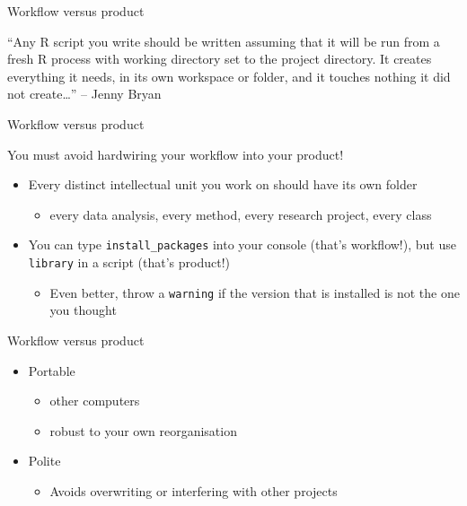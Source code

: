 \documentclass[ignorenonframetext,]{beamer}
\providecommand{\tightlist}{%
  \setlength{\itemsep}{0pt}\setlength{\parskip}{0pt}}
\begin{document}
\begin{frame}{Workflow versus product}
\protect\hypertarget{workflow-versus-product-2}{}

``Any R script you write should be written assuming that it will be run
from a fresh R process with working directory set to the project
directory. It creates everything it needs, in its own workspace or
folder, and it touches nothing it did not create\ldots{}'' -- Jenny
Bryan

\end{frame}

\begin{frame}[fragile]{Workflow versus product}
\protect\hypertarget{workflow-versus-product-3}{}

You must avoid hardwiring your workflow into your product!

\begin{itemize}
\tightlist
\item
  Every distinct intellectual unit you work on should have its own
  folder

  \begin{itemize}
  \tightlist
  \item
    every data analysis, every method, every research project, every
    class
  \end{itemize}
\item
  You can type \texttt{install\_packages} into your console (that's
  workflow!), but use \texttt{library} in a script (that's product!)

  \begin{itemize}
  \tightlist
  \item
    Even better, throw a \texttt{warning} if the version that is
    installed is not the one you thought
  \end{itemize}
\end{itemize}

\end{frame}

\begin{frame}{Workflow versus product}
\protect\hypertarget{workflow-versus-product-4}{}

\begin{itemize}
\tightlist
\item
  Portable

  \begin{itemize}
  \tightlist
  \item
    other computers
  \item
    robust to your own reorganisation
  \end{itemize}
\item
  Polite

  \begin{itemize}
  \tightlist
  \item
    Avoids overwriting or interfering with other projects
  \end{itemize}
\end{itemize}

\end{frame}
\end{document}
